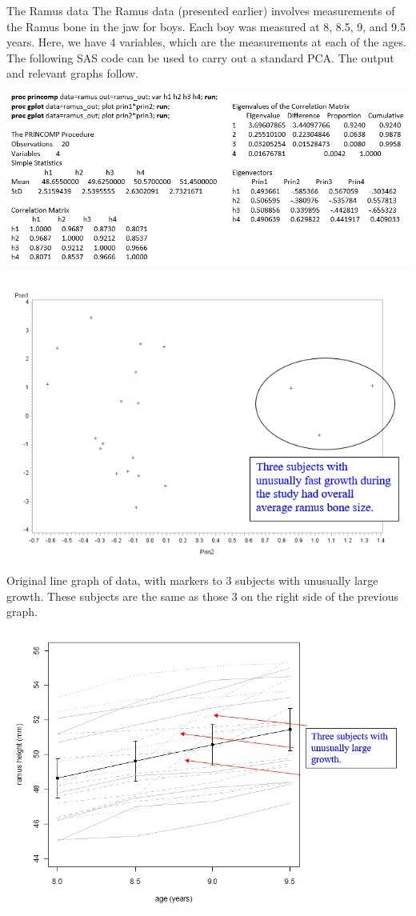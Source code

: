 \documentclass[
  9pt,
  ignorenonframetext,
]{beamer}
\begin{document}
\begin{frame}{The Ramus data}
\protect\hypertarget{the-ramus-data}{}
The Ramus data (presented earlier) involves measurements of the Ramus
bone in the jaw for boys. Each boy was measured at 8, 8.5, 9, and 9.5
years. Here, we have 4 variables, which are the measurements at each of
the ages. The following SAS code can be used to carry out a standard
PCA. The output and relevant graphs follow.

\tiny

\begin{center}\includegraphics[width=0.4\linewidth]{figs_L2/f22} \end{center}

\tiny

\tiny

\begin{center}\includegraphics[width=0.4\linewidth]{figs_L2/f21} \end{center}

\tiny
\end{frame}

\begin{frame}{}
\protect\hypertarget{section-15}{}
Original line graph of data, with markers to 3 subjects with unusually
large growth. These subjects are the same as those 3 on the right side
of the previous graph.

\tiny

\begin{center}\includegraphics[width=0.6\linewidth]{figs_L2/f23} \end{center}

\tiny
\end{frame}
\end{document}
